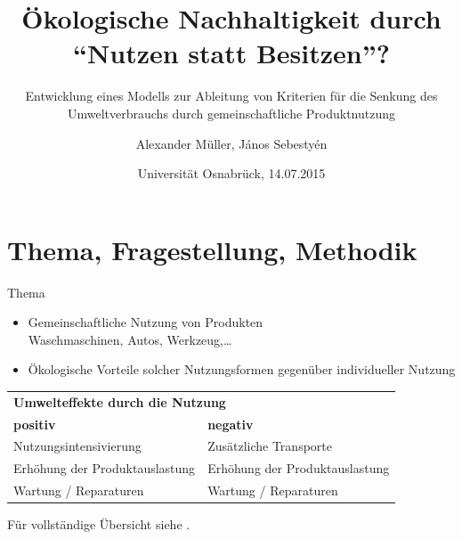 \documentclass[beamer, xcolor={table,usenames,dvipsnames}]{beamer}
\title{Ökologische Nachhaltigkeit durch \\ \enquote{Nutzen statt Besitzen}?}
\subtitle{{\small Entwicklung eines Modells zur Ableitung von Kriterien für die Senkung des Umweltverbrauchs durch gemeinschaftliche Produktnutzung}}
\author{Alexander Müller, János Sebestyén}
\date{Universität Osnabrück, 14.07.2015}
\begin{document}
\frame[plain]{\titlepage}


\begin{frame}[plain]
    \begin{center}
    \end{center}
\end{frame}
\section{Thema, Fragestellung, Methodik}

	\begin{frame}{Thema}
        \begin{itemize}
            \item Gemeinschaftliche Nutzung von Produkten \\ Waschmaschinen,
                Autos, Werkzeug,\dots
            \item Ökologische Vorteile solcher Nutzungsformen gegenüber
                individueller Nutzung
        \end{itemize}
        	\begin{center}
        		\small
        		\begin{tabular}{p{5cm}p{5cm}}
        			\multicolumn{2}{l}{\textbf{Umwelteffekte durch die
        					Nutzung}}  \\[5pt]
        			\textbf{positiv} & \textbf{negativ} \\
        			\midrule
        			Nutzungsintensivierung  &  Zusätzliche Transporte
        			\\[3pt]
        			Erhöhung der Produktauslastung  & Erhöhung der Produktauslastung \\[3pt]
        			Wartung / Reparaturen &  Wartung / Reparaturen \\[3pt]
        			\bottomrule
        		\end{tabular}
        		\vspace{3pt}
        		
        		Für vollständige Übersicht siehe \cite{scholl_marketing_2009}.
        \end{center}
	\end{frame}
\end{document}
